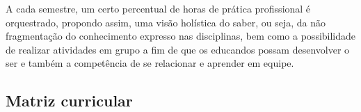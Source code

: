 \documentclass[
	12pt,				%
	openright,			%
	twoside,			%
	a4paper,			%
	chapter=TITLE,		%
	english,			%
	french,				%
	spanish,			%
	brazil,				%
	]{abntex2}
\begin{document}
A cada semestre, um certo percentual de horas de prática profissional é orquestrado, propondo assim, uma visão holística do saber, ou seja, da não fragmentação do conhecimento expresso nas disciplinas, bem como a possibilidade de realizar atividades em grupo a fim de que os educandos possam desenvolver o ser e também a competência de se relacionar e aprender em equipe.
\begin{landscape}

\section{Matriz curricular}

\newcommand{\ccel}[1]{\multicolumn{1}{c}{#1}}

\begin{quadro}[h]
\end{quadro}
\end{landscape}
\end{document}
